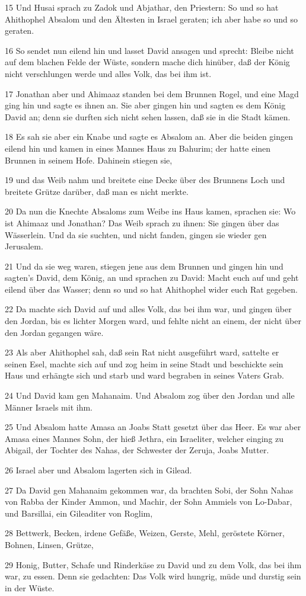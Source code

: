\par 15 Und Husai sprach zu Zadok und Abjathar, den Priestern: So und so hat Ahithophel Absalom und den Ältesten in Israel geraten; ich aber habe so und so geraten.
\par 16 So sendet nun eilend hin und lasset David ansagen und sprecht: Bleibe nicht auf dem blachen Felde der Wüste, sondern mache dich hinüber, daß der König nicht verschlungen werde und alles Volk, das bei ihm ist.
\par 17 Jonathan aber und Ahimaaz standen bei dem Brunnen Rogel, und eine Magd ging hin und sagte es ihnen an. Sie aber gingen hin und sagten es dem König David an; denn sie durften sich nicht sehen lassen, daß sie in die Stadt kämen.
\par 18 Es sah sie aber ein Knabe und sagte es Absalom an. Aber die beiden gingen eilend hin und kamen in eines Mannes Haus zu Bahurim; der hatte einen Brunnen in seinem Hofe. Dahinein stiegen sie,
\par 19 und das Weib nahm und breitete eine Decke über des Brunnens Loch und breitete Grütze darüber, daß man es nicht merkte.
\par 20 Da nun die Knechte Absaloms zum Weibe ins Haus kamen, sprachen sie: Wo ist Ahimaaz und Jonathan? Das Weib sprach zu ihnen: Sie gingen über das Wässerlein. Und da sie suchten, und nicht fanden, gingen sie wieder gen Jerusalem.
\par 21 Und da sie weg waren, stiegen jene aus dem Brunnen und gingen hin und sagten's David, dem König, an und sprachen zu David: Macht euch auf und geht eilend über das Wasser; denn so und so hat Ahithophel wider euch Rat gegeben.
\par 22 Da machte sich David auf und alles Volk, das bei ihm war, und gingen über den Jordan, bis es lichter Morgen ward, und fehlte nicht an einem, der nicht über den Jordan gegangen wäre.
\par 23 Als aber Ahithophel sah, daß sein Rat nicht ausgeführt ward, sattelte er seinen Esel, machte sich auf und zog heim in seine Stadt und beschickte sein Haus und erhängte sich und starb und ward begraben in seines Vaters Grab.
\par 24 Und David kam gen Mahanaim. Und Absalom zog über den Jordan und alle Männer Israels mit ihm.
\par 25 Und Absalom hatte Amasa an Joabs Statt gesetzt über das Heer. Es war aber Amasa eines Mannes Sohn, der hieß Jethra, ein Israeliter, welcher einging zu Abigail, der Tochter des Nahas, der Schwester der Zeruja, Joabs Mutter.
\par 26 Israel aber und Absalom lagerten sich in Gilead.
\par 27 Da David gen Mahanaim gekommen war, da brachten Sobi, der Sohn Nahas von Rabba der Kinder Ammon, und Machir, der Sohn Ammiels von Lo-Dabar, und Barsillai, ein Gileaditer von Roglim,
\par 28 Bettwerk, Becken, irdene Gefäße, Weizen, Gerste, Mehl, geröstete Körner, Bohnen, Linsen, Grütze,
\par 29 Honig, Butter, Schafe und Rinderkäse zu David und zu dem Volk, das bei ihm war, zu essen. Denn sie gedachten: Das Volk wird hungrig, müde und durstig sein in der Wüste.


